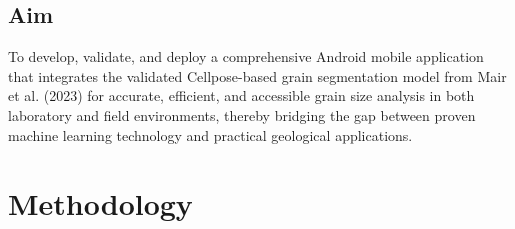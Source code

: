 \documentclass[project-plan]{report-template}
\begin{document}
\subsection{Aim}
To develop, validate, and deploy a comprehensive Android mobile application that integrates the validated Cellpose-based grain segmentation model from Mair et al. (2023) for accurate, efficient, and accessible grain size analysis in both laboratory and field environments, thereby bridging the gap between proven machine learning technology and practical geological applications.








\section{Methodology}
\end{document}

